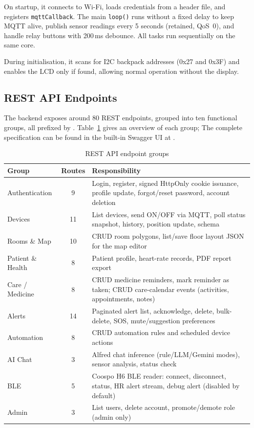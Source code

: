 On startup, it connects to Wi-Fi, loads credentials from a header file, and registers \texttt{mqttCallback}. The main \texttt{loop()} runs without a fixed delay to keep MQTT alive, publish sensor readings every 5 seconds (retained, QoS~0), and handle relay buttons with 200\,ms debounce. All tasks run sequentially on the same core.

During initialisation, it scans for I2C backpack addresses (0x27 and 0x3F) and enables the LCD only if found, allowing normal operation without the display.

\subsection{REST API Endpoints}
\label{sec:backend_impl}

The backend exposes around 80 REST endpoints, grouped into ten functional groups, all prefixed by . Table~\ref{tab:api} gives an overview of each group; The complete specification can be found in the built-in Swagger UI at .

\begin{table}[H]
\centering
\caption{REST API endpoint groups}
\label{tab:api}
\small
\begin{tabularx}{\textwidth}{@{} >{\raggedright\arraybackslash}p{2.8cm} c >{\RaggedRight\arraybackslash}X @{}}
\toprule
\textbf{Group} & \textbf{Routes} & \textbf{Responsibility} \\
\midrule
Authentication   & 9  & Login, register, signed HttpOnly cookie issuance, profile update, forgot/reset password, account deletion \\
Devices          & 11 & List devices, send ON/OFF via MQTT, poll status snapshot, history, position update, schema \\
Rooms \& Map     & 10 & CRUD room polygons, list/save floor layout JSON for the map editor \\
Patient \& Health & 8  & Patient profile, heart-rate records, PDF report export \\
Care / Medicine  & 8  & CRUD medicine reminders, mark reminder as taken; CRUD care-calendar events (activities, appointments, notes) \\
Alerts           & 14 & Paginated alert list, acknowledge, delete, bulk-delete, SOS, mute/suggestion preferences \\
Automation       & 8  & CRUD automation rules and scheduled device actions \\
AI Chat          & 3  & Alfred chat inference (rule/LLM/Gemini modes), sensor analysis, status check \\
BLE              & 5  & Coospo H6 BLE reader: connect, disconnect, status, HR alert stream, debug alert (disabled by default) \\
Admin            & 3  & List users, delete account, promote/demote role (admin only) \\
\bottomrule
\end{tabularx}
\end{table}

